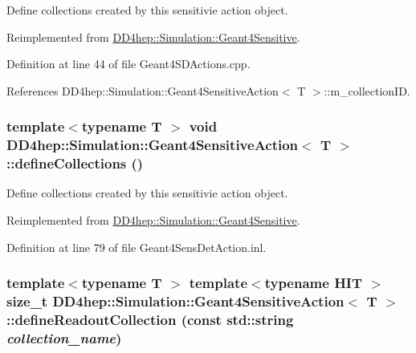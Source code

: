 Define collections created by this sensitivie action object. 

Reimplemented from \hyperlink{class_d_d4hep_1_1_simulation_1_1_geant4_sensitive_a88c872b79e49e399c8ee282960c2d77d}{DD4hep::Simulation::Geant4Sensitive}.

Definition at line 44 of file Geant4SDActions.cpp.

References DD4hep::Simulation::Geant4SensitiveAction$<$ T $>$::m\_\-collectionID.\hypertarget{class_d_d4hep_1_1_simulation_1_1_geant4_sensitive_action_a103768b61e0f22768de9a91ce588a88c}{
\subsubsection[{defineCollections}]{\setlength{\rightskip}{0pt plus 5cm}template$<$typename T $>$ void {\bf DD4hep::Simulation::Geant4SensitiveAction}$<$ T $>$::defineCollections ()}}
\label{class_d_d4hep_1_1_simulation_1_1_geant4_sensitive_action_a103768b61e0f22768de9a91ce588a88c}


Define collections created by this sensitivie action object. 

Reimplemented from \hyperlink{class_d_d4hep_1_1_simulation_1_1_geant4_sensitive_a88c872b79e49e399c8ee282960c2d77d}{DD4hep::Simulation::Geant4Sensitive}.

Definition at line 79 of file Geant4SensDetAction.inl.\hypertarget{class_d_d4hep_1_1_simulation_1_1_geant4_sensitive_action_a06c06999bf63699e91462e156e0212e1}{
\subsubsection[{defineReadoutCollection}]{\setlength{\rightskip}{0pt plus 5cm}template$<$typename T $>$ template$<$typename HIT $>$ size\_\-t {\bf DD4hep::Simulation::Geant4SensitiveAction}$<$ T $>$::defineReadoutCollection (const std::string {\em collection\_\-name})}}
\label{class_d_d4hep_1_1_simulation_1_1_geant4_sensitive_action_a06c06999bf63699e91462e156e0212e1}


